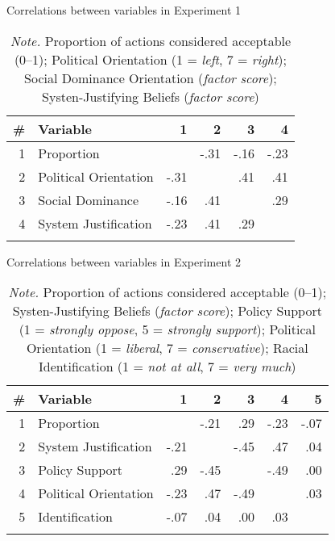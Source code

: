 \documentclass[12pt, letterpaper]{article}
\begin{document}
\begin{table}[t!]
\caption{Correlations between variables in Experiment 1}
\centering
\begin{tabular}{rlrrrr}
\toprule
\# & Variable              &    1 &    2 &    3 &    4 \\ \midrule
 1 & Proportion            &      & -.31 & -.16 & -.23 \\
 2 & Political Orientation & -.31 &      &  .41 &  .41 \\
 3 & Social Dominance      & -.16 &  .41 &      &  .29 \\
 4 & System Justification  & -.23 &  .41 &  .29 &      \\ \bottomrule
\addlinespace
\end{tabular}
\caption*{\textit{Note.} Proportion of actions considered acceptable (0--1); Political Orientation (1 = \textit{left}, 7 = \textit{right}); Social Dominance Orientation (\textit{factor score}); Systen-Justifying Beliefs (\textit{factor score})}
\end{table}

\setcounter{table}{4}

\begin{table}[t!]
\caption{Correlations between variables in Experiment 2}
\centering
\begin{tabular}{rlrrrrr}
\toprule
\# & Variable              &    1 &    2 &    3 &    4 &    5 \\ \midrule
 1 & Proportion            &      & -.21 &  .29 & -.23 & -.07 \\
 2 & System Justification  & -.21 &      & -.45 &  .47 &  .04 \\
 3 & Policy Support        &  .29 & -.45 &      & -.49 &  .00 \\
 4 & Political Orientation & -.23 &  .47 & -.49 &      &  .03 \\
 5 & Identification        & -.07 &  .04 &  .00 &  .03 &      \\ \bottomrule
\addlinespace
\end{tabular}
\caption*{\textit{Note.} Proportion of actions considered acceptable (0--1); Systen-Justifying Beliefs (\textit{factor score}); Policy Support (1 = \textit{strongly oppose}, 5 = \textit{strongly support}); Political Orientation (1 = \textit{liberal}, 7 = \textit{conservative}); Racial Identification (1 = \textit{not at all}, 7 = \textit{very much})}
\end{table}

\setcounter{table}{5}
\end{document}
